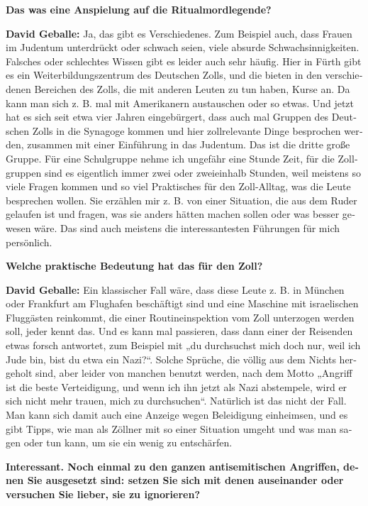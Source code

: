 \begin{otherlanguage}{ngerman}
\textbf{Das was eine Anspielung auf die Ritualmordlegende?} 

\textbf{David Geballe:} Ja, das gibt es Verschiedenes. Zum Beispiel auch, dass Frauen im Judentum unterdrückt oder schwach seien, viele absurde Schwachsinnigkeiten. Falsches oder schlechtes Wissen gibt es leider auch sehr häufig. Hier in Fürth gibt es ein Weiterbildungszentrum des Deutschen Zolls, und die bieten in den verschiedenen Bereichen des Zolls, die mit anderen Leuten zu tun haben, Kurse an. Da kann man sich z. B. mal mit Amerikanern austauschen oder so etwas. Und jetzt hat es sich seit etwa vier Jahren eingebürgert, dass auch mal Gruppen des Deutschen Zolls in die Synagoge kommen und hier zollrelevante Dinge besprochen werden, zusammen mit einer Einführung in das Judentum. Das ist die dritte große Gruppe. Für eine Schulgruppe nehme ich ungefähr eine Stunde Zeit, für die Zollgruppen sind es eigentlich immer zwei oder zweieinhalb Stunden, weil meistens so viele Fragen kommen und so viel Praktisches für den Zoll-Alltag, was die Leute besprechen wollen. Sie erzählen mir z. B. von einer Situation, die aus dem Ruder gelaufen ist und fragen, was sie anders hätten machen sollen oder was besser gewesen wäre. Das sind auch meistens die interessantesten Führungen für mich persönlich. 

\textbf{Welche praktische Bedeutung hat das für den Zoll?}

\textbf{David Geballe:} Ein klassischer Fall wäre, dass diese Leute z. B. in München oder Frankfurt am Flughafen beschäftigt sind und eine Maschine mit israelischen Fluggästen reinkommt, die einer Routineinspektion vom Zoll unterzogen werden soll, jeder kennt das. Und es kann mal passieren, dass dann einer der Reisenden etwas forsch antwortet, zum Beispiel mit „du durchsuchst mich doch nur, weil ich Jude bin, bist du etwa ein Nazi?“. Solche Sprüche, die völlig aus dem Nichts hergeholt sind, aber leider von manchen benutzt werden, nach dem Motto „Angriff ist die beste Verteidigung, und wenn ich ihn jetzt als Nazi abstempele, wird er sich nicht mehr trauen, mich zu durchsuchen“. Natürlich ist das nicht der Fall. Man kann sich damit auch eine Anzeige wegen Beleidigung einheimsen, und es gibt Tipps, wie man als Zöllner mit so einer Situation umgeht und was man sagen oder tun kann, um sie ein wenig zu entschärfen. 

\textbf{Interessant. Noch einmal zu den ganzen antisemitischen Angriffen, denen Sie ausgesetzt sind: setzen Sie sich mit denen auseinander oder versuchen Sie lieber, sie zu ignorieren?} 


\end{otherlanguage}
